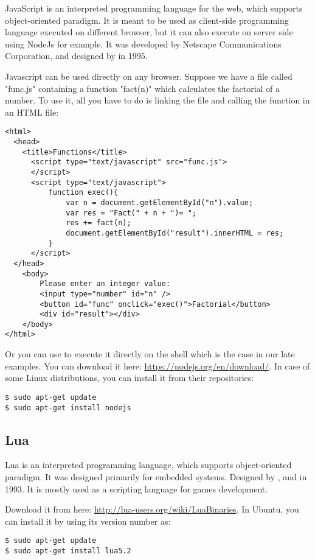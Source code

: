 \documentclass{KodeBook}
\begin{document}
JavaScript is an interpreted programming language for the web, which supports object-oriented paradigm. 
It is meant to be used as client-side programming language executed on different browser, but it can also execute on server side using NodeJs for example.
It was developed by Netscape Communications Corporation, and designed by  in 1995. 

Javascript can be used directly on any browser. 
Suppose we have a file called "func.js" containing a function "fact(n)" which calculates the factorial of a number. 
To use it, all you have to do is linking the file and calling the function in an HTML file:
\begin{lstlisting}[style=codeStyle]
<html>
  <head>
    <title>Functions</title>
      <script type="text/javascript" src="func.js">
      </script>
      <script type="text/javascript">
          function exec(){
              var n = document.getElementById("n").value;
              var res = "Fact(" + n + ")= ";
              res += fact(n);
              document.getElementById("result").innerHTML = res;
          }
      </script>
  </head>
    <body>
        Please enter an integer value: 
        <input type="number" id="n" />
        <button id="func" onclick="exec()">Factorial</button>
        <div id="result"></div>
    </body>
</html>
\end{lstlisting}


Or you can use  to execute it directly on the shell which is the case in our late examples. 
You can download it here: \url{https://nodejs.org/en/download/}. 
In case of some Linux distributions, you can install it from their repositories:
\begin{lstlisting}[style=shellStyle]
$ sudo apt-get update
$ sudo apt-get install nodejs
\end{lstlisting}

\subsection{Lua}

Lua is an interpreted programming language, which supports object-oriented paradigm. 
It was designed primarily for embedded systems.
Designed by ,  and  in 1993.
It is mostly used as a scripting language for games development.

Download it from here: \url{http://lua-users.org/wiki/LuaBinaries}. 
In Ubuntu, you can install it by using its version number as:
\begin{lstlisting}[style=shellStyle]
$ sudo apt-get update
$ sudo apt-get install lua5.2
\end{lstlisting}
\end{document}
